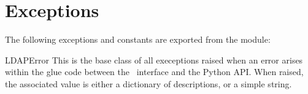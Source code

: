

\section{Exceptions}

The following exceptions and constants are exported from the module:

\newcommand{\excline}[1]{\item[\bfcode{#1}\ttindex{#1}]}


\begin{excdesc}{LDAPError}
This is the base class of all execeptions raised when an error arises within
the glue code between the \C\ interface and the Python API.
When raised, the associated value is either a dictionary of descriptions,
or a simple string.
\end{excdesc}


